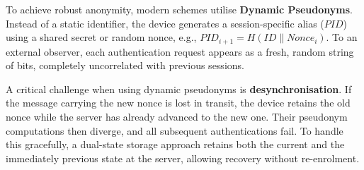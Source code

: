 To achieve robust anonymity, modern schemes utilise \textbf{Dynamic Pseudonyms}.
Instead of a static identifier, the device generates a session-specific alias
($\mathit{PID}$) using a shared secret or random nonce, e.g.,
$\mathit{PID}_{i+1} = H(\mathit{ID} \| \mathit{Nonce}_i)$.
To an external observer, each authentication request appears as a fresh, random
string of bits, completely uncorrelated with previous sessions.

A critical challenge when using dynamic pseudonyms is \textbf{desynchronisation}.
If the message carrying the new nonce is lost in transit, the device retains the old
nonce while the server has already advanced to the new one.
Their pseudonym computations then diverge, and all subsequent authentications fail.
To handle this gracefully, a dual-state storage approach retains both the current and
the immediately previous state at the server, allowing recovery without re-enrolment.
